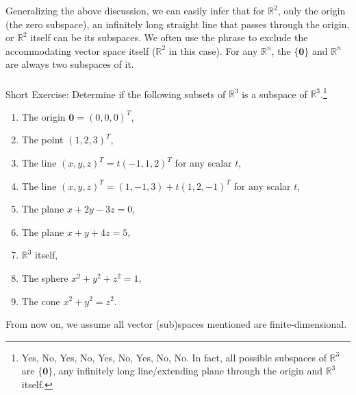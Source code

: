 Generalizing the above discussion, we can easily infer that for $\mathbb{R}^2$, only the origin (the zero subspace), an infinitely long straight line that passes through the origin, or $\mathbb{R}^2$ itself can be its subspaces. We often use the phrase  to exclude the accommodating vector space itself ($\mathbb{R}^2$ in this case). For any $\mathbb{R}^n$, the  $\{\textbf{0}\}$ and  $\mathbb{R}^n$ are always two subspaces of it. \\
\\
Short Exercise: Determine if the following subsets of $\mathbb{R}^3$ is a subspace of $\mathbb{R}^3$.\footnote{Yes, No, Yes, No, Yes, No, Yes, No, No. In fact, all possible subspaces of $\mathbb{R}^3$ are $\{\textbf{0}\}$, any infinitely long line/extending plane through the origin and $\mathbb{R}^3$ itself.}
\begin{enumerate}[label=(\alph*)]
\item The origin $\textbf{0} = (0,0,0)^T$,
\item The point $(1,2,3)^T$,
\item The line $(x,y,z)^T = t(-1, 1, 2)^T$ for any scalar $t$,
\item The line $(x,y,z)^T = (1, -1, 3) + t(1, 2, -1)^T$ for any scalar $t$,
\item The plane $x + 2y - 3z = 0$,
\item The plane $x + y + 4z = 5$,
\item $\mathbb{R}^3$ itself,
\item The sphere $x^2 + y^2 + z^2 = 1$,
\item The cone $x^2 + y^2 = z^2$.
\end{enumerate}
From now on, we assume all vector (sub)spaces mentioned are finite-dimensional.

